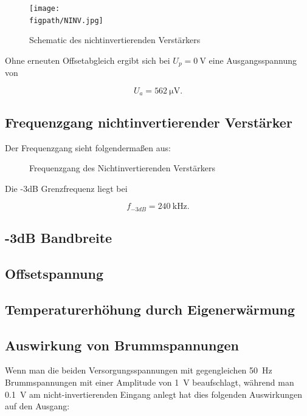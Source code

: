 \begin{figure}[H]
    \centering
    \texttt{[image: \\figpath/NINV.jpg]}
    \caption{Schematic des nichtinvertierenden Verstärkers}
    \label{fig_Kap5_23:SpiceSchematic}
\end{figure}

Ohne erneuten Offsetabgleich ergibt sich bei $U_p = \SI{0}{\volt}$ eine Ausgangsspannung von 

\begin{equation*}
    U_a = \SI{562}{\micro\volt} .
\end{equation*}

\subsection{Frequenzgang nichtinvertierender Verstärker}
Der Frequenzgang sieht folgendermaßen aus:

\begin{figure}[H]
	\centering \small
	\scalebox{0.9}{}
	\caption{Frequenzgang des Nichtinvertierenden Verstärkers}
	\label{fig_Kap5_23:Mag}
\end{figure}

Die -3dB Grenzfrequenz liegt bei

\begin{equation}
    f_{-3dB} = \SI{240}{\kilo\hertz} .
\end{equation}

\subsection{-3dB Bandbreite}

\subsection{Offsetspannung}

\subsection{Temperaturerhöhung durch Eigenerwärmung}

\subsection{Auswirkung von Brummspannungen}
Wenn man die beiden Versorgungsspannungen mit gegengleichen \SI{50}{\hertz} Brummspannungen mit einer Amplitude von \SI{1}{\volt} beaufschlagt, während man \SI{0.1}{\volt} am nicht-invertierenden Eingang anlegt hat dies folgenden Auswirkungen auf den Ausgang:

